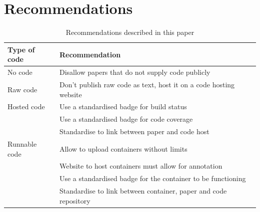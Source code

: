 \section*{Recommendations}

\begin{table}[h]
  \begin{tabular}{|p{2cm}|l|}
    \hline
    \textbf{Type of code} & \textbf{Recommendation} \\
    \hline
    No code       & Disallow papers that do not supply code publicly \\
    \hline
    Raw code      & Don't publish raw code as text, host it on a code hosting website \\
    \hline
    Hosted code   & Use a standardised badge for build status \\
                  & Use a standardised badge for code coverage \\
                  & Standardise to link between paper and code host \\
    \hline
    Runnable code & Allow to upload containers without limits \\
                  & Website to host containers must allow for annotation \\
                  & Use a standardised badge for the container to be functioning  \\
                  & Standardise to link between container, paper and code repository \\
    \hline
  \end{tabular}
  \caption{Recommendations described in this paper}
  \label{tab:recommendations}
\end{table}


\fi
